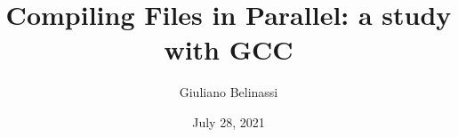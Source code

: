 \documentclass[
  xcolor={hyperref,svgnames,x11names,table},
  hyperref={pdfencoding=unicode,plainpages=false,pdfpagelabels=true,breaklinks=true},
  brazilian,english,12pt,aspectratio=149,
]{beamer}
\title[The shortened title]{Compiling Files in Parallel: a study with GCC}
\author[Authors Name]{Giuliano Belinassi}
\institute[USP]{Computer Science Department \\ IME USP}
\date{July 28, 2021}
\begin{document}


\par

\end{document}
